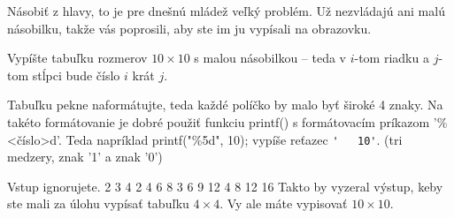 




Násobiť z hlavy, to je pre dnešnú mládež veľký problém.
Už nezvládajú ani malú násobilku, takže vás poprosili, aby ste im
ju vypísali na obrazovku.


Vypíšte tabuľku rozmerov $10 \times 10$ s malou násobilkou -- teda v $i$-tom riadku
a $j$-tom stĺpci bude číslo $i$ krát $j$.

Tabuľku pekne naformátujte, teda každé políčko by malo byť široké 4 znaky.
Na takéto formátovanie je dobré použiť funkciu printf() s formátovacím 
príkazom '\%<číslo>d'. Teda napríklad printf("\%5d", 10); vypíše reťazec \verb!'   10'!.
(tri medzery, znak '1' a znak '0')


\vstup
Vstup ignorujete.
   2   3   4%
   2   4   6   8%
   3   6   9  12%
   4   8  12  16%
\komentar
Takto by vyzeral výstup, keby ste mali za úlohu vypísať tabuľku $4\times 4$.
Vy ale máte vypisovať $10\times 10$.
\koniec


